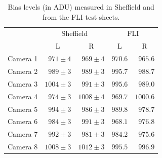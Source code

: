 \begin{colsection}
\begin{colsection}
\begin{table}[t]
    \begin{center}
        \begin{tabular}{c|rr|rr} %
             & \multicolumn{2}{c|}{Sheffield} & \multicolumn{2}{c}{FLI} \\
             & \multicolumn{1}{c}{L} &
               \multicolumn{1}{c|}{R} &
               \multicolumn{1}{c}{L} &
               \multicolumn{1}{c}{R} \\
            \midrule
            Camera 1 &  $971\pm4$ &  $969\pm4$ & $970.6$ &  $965.6$ \\
            Camera 2 &  $989\pm3$ &  $989\pm3$ & $995.7$ &  $988.7$ \\
            Camera 3 & $1004\pm3$ &  $991\pm3$ & $995.6$ &  $989.0$ \\
            Camera 4 &  $974\pm3$ & $1008\pm4$ & $969.7$ & $1000.6$ \\
            Camera 5 &  $994\pm3$ &  $986\pm3$ & $989.8$ &  $978.7$ \\
            Camera 6 &  $984\pm3$ &  $991\pm3$ & $968.1$ &  $976.8$ \\
            Camera 7 &  $992\pm3$ &  $981\pm3$ & $984.2$ &  $975.6$ \\
            Camera 8 & $1008\pm3$ & $1012\pm3$ & $995.5$ &  $996.9$ \\
        \end{tabular}
    \end{center}
    \caption[TODO]{
        Bias levels (in ADU) measured in Sheffield and from the FLI test sheets.
        }\label{tab:bias}
\end{table}


\end{colsection}
\end{colsection}
